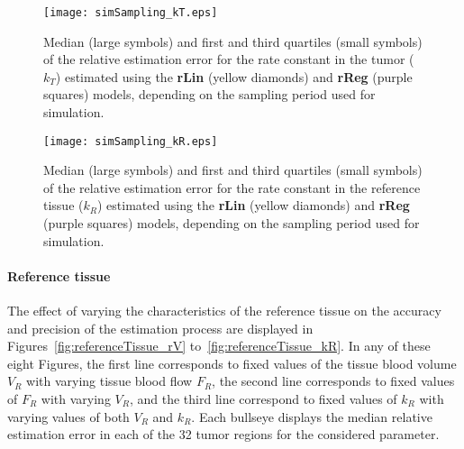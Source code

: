 \begin{figure}
\texttt{[image: simSampling\_kT.eps]}
\caption{Median (large symbols) and first and third quartiles (small symbols) of the relative estimation error for the rate constant in the tumor ($k_T$) estimated using the \textbf{rLin} (yellow diamonds) and \textbf{rReg} (purple squares) models, depending on the sampling period used for simulation.}
\label{fig:sampling_kT}
\end{figure}

\begin{figure}
\texttt{[image: simSampling\_kR.eps]}
\caption{Median (large symbols) and first and third quartiles (small symbols) of the relative estimation error for the rate constant in the reference tissue ($k_R$) estimated using the \textbf{rLin} (yellow diamonds) and \textbf{rReg} (purple squares) models, depending on the sampling period used for simulation.}
\label{fig:sampling_kR}
\end{figure}

\paragraph{Reference tissue}
The effect of varying the characteristics of the reference tissue on the accuracy and precision of the estimation process are displayed in Figures~\ref{fig:referenceTissue_rV} to~\ref{fig:referenceTissue_kR}. 
In any of these eight Figures, the first line corresponds to fixed values of the tissue blood volume $V_R$ with varying tissue blood flow $F_R$, the second line corresponds to fixed values of $F_R$ with varying $V_R$, and the third line correspond to fixed values of $k_R$ with varying values of both $V_R$ and $k_R$.
Each bullseye displays the median relative estimation error in each of the 32 tumor regions for the considered parameter.

